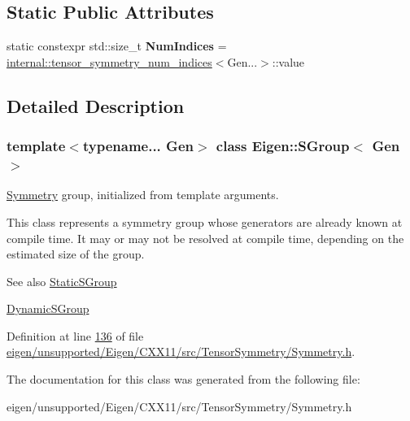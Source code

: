 \subsection*{Static Public Attributes}
\begin{DoxyCompactItemize}
\item 
\mbox{\label{class_eigen_1_1_s_group_a990d6a87e7a8feb1e575812e78fa0047}} 
static constexpr std\+::size\+\_\+t {\bfseries Num\+Indices} = \hyperlink{struct_eigen_1_1internal_1_1tensor__symmetry__num__indices}{internal\+::tensor\+\_\+symmetry\+\_\+num\+\_\+indices}$<$Gen...$>$\+::value
\end{DoxyCompactItemize}


\subsection{Detailed Description}
\subsubsection*{template$<$typename... Gen$>$\newline
class Eigen\+::\+S\+Group$<$ Gen $>$}

\hyperlink{struct_eigen_1_1_symmetry}{Symmetry} group, initialized from template arguments. 

This class represents a symmetry group whose generators are already known at compile time. It may or may not be resolved at compile time, depending on the estimated size of the group.

\begin{DoxySeeAlso}{See also}
\hyperlink{class_eigen_1_1_static_s_group}{Static\+S\+Group} 

\hyperlink{class_eigen_1_1_dynamic_s_group}{Dynamic\+S\+Group} 
\end{DoxySeeAlso}


Definition at line \hyperlink{eigen_2unsupported_2_eigen_2_c_x_x11_2src_2_tensor_symmetry_2_symmetry_8h_source_l00136}{136} of file \hyperlink{eigen_2unsupported_2_eigen_2_c_x_x11_2src_2_tensor_symmetry_2_symmetry_8h_source}{eigen/unsupported/\+Eigen/\+C\+X\+X11/src/\+Tensor\+Symmetry/\+Symmetry.\+h}.



The documentation for this class was generated from the following file\+:\begin{DoxyCompactItemize}
\item 
eigen/unsupported/\+Eigen/\+C\+X\+X11/src/\+Tensor\+Symmetry/\+Symmetry.\+h\end{DoxyCompactItemize}
